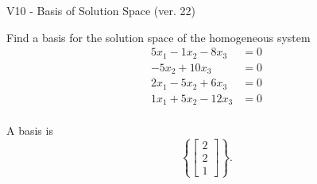 \begin{exercise}
  \begin{exerciseTitle}V10 - Basis of Solution Space (ver. 22)\end{exerciseTitle}
  \begin{exerciseStatement}
    Find a basis for the solution space of the homogeneous system 
\begin{align*}
 5 x_ 1 -1 x_ 2 -8 x_ 3 &= 0  \\ 
  -5 x_ 2 + 10 x_ 3 &= 0  \\ 
  2 x_ 1 -5 x_ 2 + 6 x_ 3 &= 0  \\ 
  1 x_ 1 + 5 x_ 2 -12 x_ 3 &= 0  \\ 
 \end{align*}


 
  \end{exerciseStatement}

  \begin{exerciseAnswer}
   A basis is   
\[\left\{\left[\begin{array}{c}
2 \\
2 \\
1
\end{array}\right]\right\}.\]

  


  \end{exerciseAnswer}
\end{exercise}